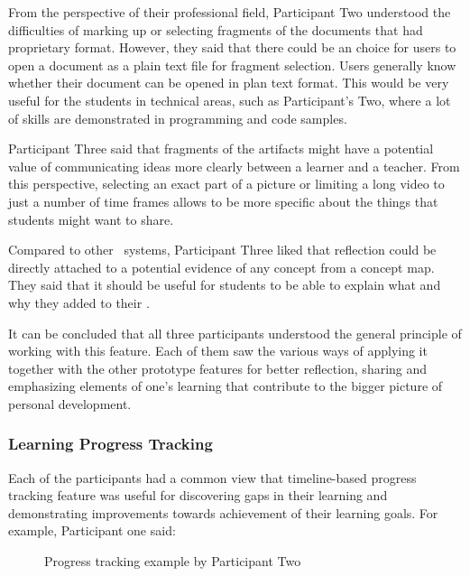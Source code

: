 From the perspective of their professional field, Participant Two understood the
difficulties of marking up or selecting fragments of the documents that had
proprietary format. However, they said that there could be an choice for users
to open a document as a plain text file for fragment selection. Users generally
know whether their document can be opened in plan text format. This would be
very useful for the students in technical areas, such as Participant's Two,
where a lot of skills are demonstrated in programming and code samples.

Participant Three said that fragments of the artifacts might have a potential
value of communicating ideas more clearly between a learner and a teacher.
From this perspective, selecting an exact part of a picture or limiting a long
video to just a number of time frames allows to be more specific about the
things that students might want to share.

Compared to other \ep~systems, Participant Three liked that reflection could be
directly attached to a potential evidence of any concept from a concept map.
They said that it should be useful for students to be able to explain what and
why they added to their \ep.

It can be concluded that all three participants understood the general principle
of working with this feature. Each of them saw the various ways of applying it
together with the other prototype features for better reflection, sharing and
emphasizing elements of one's learning that contribute to the bigger picture of
personal development.

\subsubsection{Learning Progress Tracking}

Each of the participants had a common view that timeline-based progress tracking
feature was useful for discovering gaps in their learning and demonstrating
improvements towards achievement of their learning goals. For example,
Participant one said:


\begin{figure}[htb]
\centering
\setlength\fboxsep{0pt}
\setlength\fboxrule{0.5pt}
\caption{Progress tracking example by Participant Two}
\label{fig:p2timeline}
\end{figure}

